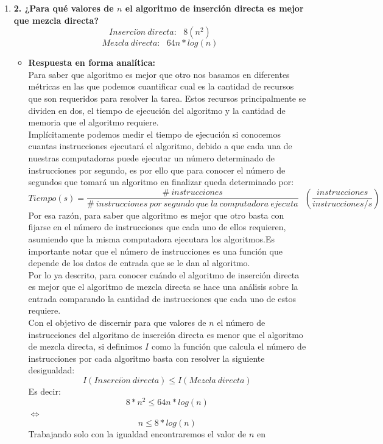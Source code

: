 \documentclass[11 pt, a4paper]{article}
\theoremstyle{definition}
\begin{document}
\begin{enumerate}
  \item \textbf{2. ¿Para qué valores de $n$ el algoritmo de inserción directa es mejor que mezcla directa? }
    \[ Inserci\acute{o}n \ directa : \ \ \ 8(n^2)\]
    \[ Mezcla\ directa: \ \ \ 64n*log(n) \]
    \begin{itemize}
     \item \textbf{Respuesta en forma analítica:} \\ 
      Para saber que algoritmo es mejor que otro nos basamos en diferentes 
      métricas en las que podemos cuantificar cual es la cantidad
      de recursos que son requeridos para resolver la tarea. Estos 
      recursos principalmente se dividen en dos, el tiempo de ejecución del
      algoritmo y la cantidad de memoria que el algoritmo requiere.\\
      Implícitamente podemos medir el tiempo de ejecución si conocemos 
      cuantas instrucciones ejecutará el algoritmo, debido  a que 
      cada una de nuestras computadoras puede ejecutar un número determinado
      de instrucciones por segundo, es por ello que para conocer el número
      de segundos que tomará un algoritmo en finalizar queda determinado 
      por:
      \[ Tiempo (s) =\frac{\#\ instrucciones}{\#\ instrucciones\ por\ segundo\ que\ la\ computadora\ ejecuta}\ \ \ \left( \frac{instrucciones}{instrucciones/s} \right) \]
      Por esa razón, para saber que algoritmo es mejor que otro 
      basta con fijarse en el número de instrucciones que cada
      uno de ellos requieren, asumiendo que la misma computadora ejecutara 
      los algoritmos.Es importante notar que   el número de instrucciones 
      es una función que depende de los datos de entrada que se le dan al 
      algoritmo. \\
      Por lo ya descrito, para conocer cuándo el algoritmo de 
      inserción directa es mejor que el algoritmo de mezcla directa se 
      hace una análisis sobre la entrada comparando la cantidad de 
      instrucciones que cada uno de estos requiere.\\
      Con el objetivo de discernir para que valores de $n$ el número 
      de instrucciones del algoritmo de inserción directa es menor
      que el algoritmo de mezcla directa, si definimos $I$ como la 
      función que calcula el número de instrucciones por cada algoritmo 
      basta con resolver la siguiente desigualdad:
       \[ I(Inserci\acute{o}n\ directa) \leq I( Mezcla \  directa) \]
      Es decir:
       \[ 8*n^2 \leq 64n*log(n) \]
      $\Longleftrightarrow$
	\[ n \leq 8*log(n) \]
      Trabajando solo con la igualdad encontraremos el valor de $n$ en 

\end{itemize}
\end{enumerate}
\end{document}
